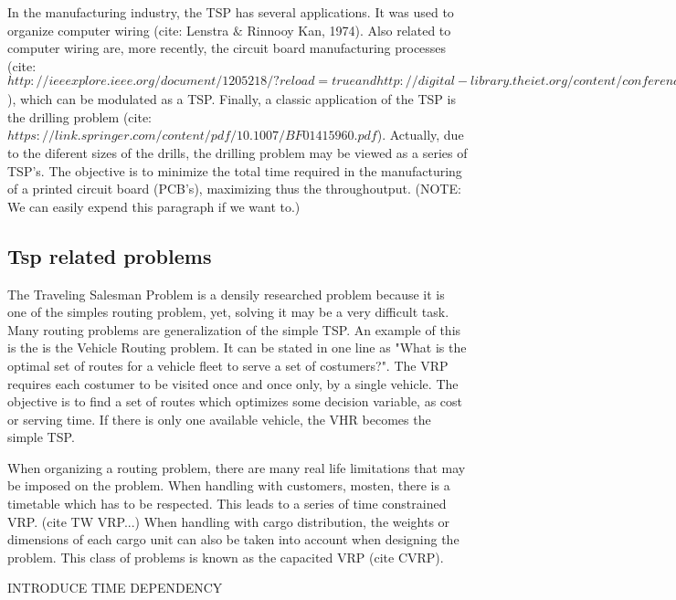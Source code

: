 In the manufacturing industry, the TSP has several applications.
It was used to organize computer wiring (cite: Lenstra $\&$ Rinnooy Kan, 1974).
Also related to computer wiring are, more recently, the circuit board  manufacturing processes
(cite: $http://ieeexplore.ieee.org/document/1205218/?reload=true and http://digital-library.theiet.org/content/conferences/10.1049/cp_19991183$),
which can be modulated as a TSP.
Finally, a classic application of the TSP is the drilling problem (cite: $https://link.springer.com/content/pdf/10.1007/BF01415960.pdf$). Actually,
due to the diferent sizes of the drills, 
the drilling problem may be viewed as a series of TSP's. 
The objective is to minimize the total time required in the manufacturing of a 
printed circuit board (PCB's), maximizing thus the throughoutput.
(NOTE: We can easily expend this paragraph if we want to.)
 
 
 
 
\subsection{Tsp related problems}

The Traveling Salesman Problem is a densily researched problem because it is 
one of the simples routing problem, yet, solving it may be a very difficult task. 
Many routing problems are generalization of the simple TSP. An example of this is the 
is the Vehicle Routing problem. It can be stated in one line as "What is the optimal
set of routes for a vehicle fleet to serve a set of costumers?". The VRP requires 
each costumer to be visited once and once only, by a single vehicle. The objective 
is to find a set of routes which optimizes some decision variable, as cost or serving time.
If there is only one available vehicle, the VHR becomes the simple TSP. 

When organizing a routing problem, there are many real life limitations that may be imposed on the problem.
When handling with customers, mosten, there is a timetable which has to be respected. 
This leads to a series of time constrained VRP. (cite TW VRP...)
When handling with cargo distribution, the weights or dimensions of each cargo unit 
can also be taken into account when designing the problem. This class of problems 
is known as the capacited VRP (cite CVRP).

INTRODUCE TIME DEPENDENCY 
 









